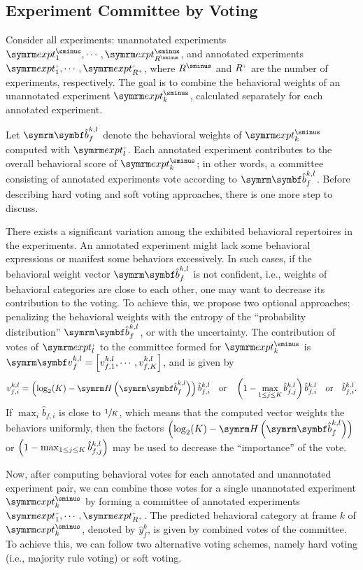 \subsection{Experiment Committee by Voting}\label{section:committee-by-voting}
Consider all experiments: unannotated experiments $\exptUnann_1, \cdots, \exptUnann_{\Unann{R}}$, and annotated experiments $\exptAnn_1, \cdots, \exptAnn_{\Ann{R}}$, where $\Unann{R}$ and $\Ann{R}$ are the number of experiments, respectively.
The goal is to combine the behavioral weights of an unannotated experiment $\exptUnann_k$, calculated separately for each annotated experiment.

Let $\V{\hat{b}}_f^{k,l}$ denote the behavioral weights of $\exptUnann_k$ computed with $\exptAnn_l$. Each annotated experiment contributes to the overall behavioral score of $\exptUnann_k$; in other words, a committee consisting of annotated experiments vote according to $\V{\hat{b}}_f^{k,l}$. Before describing hard voting and soft voting approaches, there is one more step to discuss.

There exists a significant variation among the exhibited behavioral repertoires in the experiments.
An annotated experiment might lack some behavioral expressions or manifest some behaviors excessively.
In such cases, if the behavioral weight vector $\V{\hat{b}}_f^{k,l}$ is not confident, i.e., weights of behavioral categories are close to each other, one may want to decrease its contribution to the voting.
To achieve this, we propose two optional approaches; penalizing the behavioral weights with the entropy of the ``probability distribution'' $\V{\hat{b}}_f^{k,l}$, or with the uncertainty.
The contribution of votes of $\exptAnn_l$ to the committee formed for $\exptUnann_k$ is $\V{v}_f^{k,l} = \qmatrix{v_{f,1}^{k,l}, \cdots, v_{f,K}^{k,l}}$, and is given by
\begin{equation}
	v_{f,i}^{k,l} = \rbr{\log_2(K) - \entropy{\V{\hat{b}}_f^{k,l}}} \hat{b}_{f,i}^{k,l} \qbor \rbr{ 1 - \max_{1 \leq j \leq K} \hat{b}_{f,j}^{k,l}} \hat{b}_{f,i}^{k,l} \qbor \hat{b}_{f,i}^{k,l}.
\end{equation}
If $\max_i \hat{b}_{f,i}$ is close to $\sfrac{1}{K}$, which means that the computed vector weights the behaviors uniformly, then the factors $\rbr{\log_2(K) - \entropy{\V{\hat{b}}_f^{k,l}}}$ or $\left( 1 - \max_{1 \leq j \leq K} \hat{b}_{f,j}^{k,l}\right)$ may be used to decrease the ``importance'' of the vote.

Now, after computing behavioral votes for each annotated and unannotated experiment pair, we can combine those votes for a single unannotated experiment $\exptUnann_k$  by forming a committee of annotated experiments $\exptAnn_1, \cdots, \exptAnn_{\Ann{R}}$.
The predicted behavioral category at frame $k$ of $\exptUnann_k$, denoted by $\hat{y}^k_f$, is given by combined votes of the committee.
To achieve this, we can follow two alternative voting schemes, namely hard voting (i.e., majority rule voting) or soft voting.


